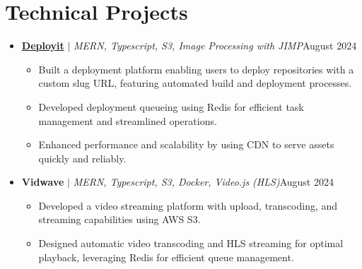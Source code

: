 \documentclass[letterpaper,11pt]{article}
\begin{document}
\section{Technical Projects}
\vspace{-1pt}
\begin{itemize}[leftmargin=*,itemsep=2pt,parsep=0pt,topsep=0pt,partopsep=0pt]

	\item \textbf{\href{https://deployit.live/}{Deployit}} $|$ \emph{MERN, Typescript, S3, Image Processing with JIMP}\hfill {August 2024}
	      \begin{itemize}[leftmargin=*,itemsep=1pt,parsep=0pt,topsep=0pt,partopsep=0pt]
		      \item Built a deployment platform enabling users to deploy repositories with a custom
		            slug URL, featuring automated build and deployment processes.
		      \item Developed deployment queueing using Redis for efficient task management and
		            streamlined operations.
		      \item Enhanced performance and scalability by using CDN to serve assets quickly and
		            reliably.
	      \end{itemize}

	\item \textbf{Vidwave} $|$ \emph{MERN, Typescript, S3, Docker, Video.js (HLS)}\hfill {August 2024}
	      \begin{itemize}[leftmargin=*,itemsep=1pt,parsep=0pt,topsep=0pt,partopsep=0pt]
		      \item Developed a video streaming platform with upload, transcoding, and streaming
		            capabilities using AWS S3.
		      \item Designed automatic video transcoding and HLS streaming for optimal playback,
		            leveraging Redis for efficient queue management.
	      \end{itemize}

\end{itemize}
\vspace{-8pt}
\end{document}
